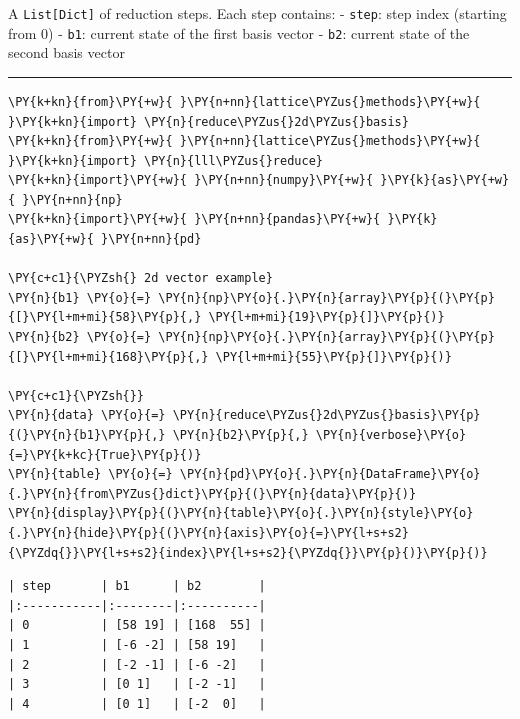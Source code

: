 \documentclass[a4paper,12pt]{article}
\begin{document}
\begin{tcolorbox}[
    width=\linewidth,       
    left=10mm, right=10mm,
    top=1mm, bottom=1mm,
    breakable,
]
A \texttt{List{[}Dict{]}} of reduction steps. Each step contains: -
\texttt{\textquotesingle{}step\textquotesingle{}}: step index (starting
from 0) - \texttt{\textquotesingle{}b1\textquotesingle{}}: current state
of the first basis vector -
\texttt{\textquotesingle{}b2\textquotesingle{}}: current state of the
second basis vector

\begin{center}\rule{0.5\linewidth}{0.5pt}\end{center}
	

    \begin{tcolorbox}[breakable, size=fbox, boxrule=1pt, pad at break*=1mm,colback=cellbackground, colframe=cellborder]
\begin{Verbatim}[commandchars=\\\{\}]
\PY{k+kn}{from}\PY{+w}{ }\PY{n+nn}{lattice\PYZus{}methods}\PY{+w}{ }\PY{k+kn}{import} \PY{n}{reduce\PYZus{}2d\PYZus{}basis}
\PY{k+kn}{from}\PY{+w}{ }\PY{n+nn}{lattice\PYZus{}methods}\PY{+w}{ }\PY{k+kn}{import} \PY{n}{lll\PYZus{}reduce}
\PY{k+kn}{import}\PY{+w}{ }\PY{n+nn}{numpy}\PY{+w}{ }\PY{k}{as}\PY{+w}{ }\PY{n+nn}{np}
\PY{k+kn}{import}\PY{+w}{ }\PY{n+nn}{pandas}\PY{+w}{ }\PY{k}{as}\PY{+w}{ }\PY{n+nn}{pd}

\PY{c+c1}{\PYZsh{} 2d vector example}
\PY{n}{b1} \PY{o}{=} \PY{n}{np}\PY{o}{.}\PY{n}{array}\PY{p}{(}\PY{p}{[}\PY{l+m+mi}{58}\PY{p}{,} \PY{l+m+mi}{19}\PY{p}{]}\PY{p}{)}
\PY{n}{b2} \PY{o}{=} \PY{n}{np}\PY{o}{.}\PY{n}{array}\PY{p}{(}\PY{p}{[}\PY{l+m+mi}{168}\PY{p}{,} \PY{l+m+mi}{55}\PY{p}{]}\PY{p}{)}

\PY{c+c1}{\PYZsh{}}
\PY{n}{data} \PY{o}{=} \PY{n}{reduce\PYZus{}2d\PYZus{}basis}\PY{p}{(}\PY{n}{b1}\PY{p}{,} \PY{n}{b2}\PY{p}{,} \PY{n}{verbose}\PY{o}{=}\PY{k+kc}{True}\PY{p}{)}
\PY{n}{table} \PY{o}{=} \PY{n}{pd}\PY{o}{.}\PY{n}{DataFrame}\PY{o}{.}\PY{n}{from\PYZus{}dict}\PY{p}{(}\PY{n}{data}\PY{p}{)}
\PY{n}{display}\PY{p}{(}\PY{n}{table}\PY{o}{.}\PY{n}{style}\PY{o}{.}\PY{n}{hide}\PY{p}{(}\PY{n}{axis}\PY{o}{=}\PY{l+s+s2}{\PYZdq{}}\PY{l+s+s2}{index}\PY{l+s+s2}{\PYZdq{}}\PY{p}{)}\PY{p}{)}
\end{Verbatim}
\end{tcolorbox}

      \begin{Verbatim}[commandchars=\\\{\}]
| step       | b1      | b2        |
|:-----------|:--------|:----------|
| 0          | [58 19] | [168  55] |
| 1          | [-6 -2] | [58 19]   |
| 2          | [-2 -1] | [-6 -2]   |
| 3          | [0 1]   | [-2 -1]   |
| 4          | [0 1]   | [-2  0]   |
    \end{Verbatim}
    \end{tcolorbox}
\end{document}
